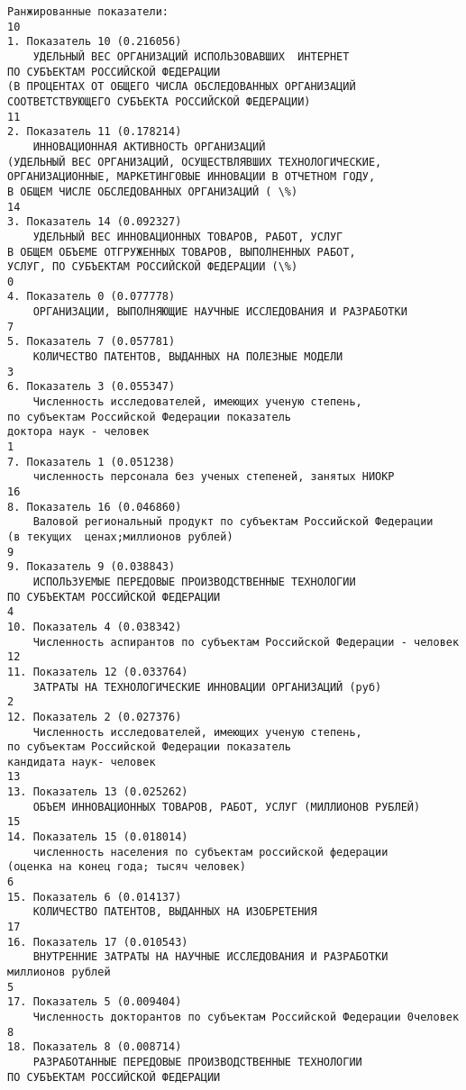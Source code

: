 \documentclass[11pt]{article}
\begin{document}
    \begin{Verbatim}[commandchars=\\\{\}]
Ранжированные показатели:
10
1. Показатель 10 (0.216056)
	УДЕЛЬНЫЙ ВЕС ОРГАНИЗАЦИЙ ИСПОЛЬЗОВАВШИХ  ИНТЕРНЕТ
ПО СУБЪЕКТАМ РОССИЙСКОЙ ФЕДЕРАЦИИ
(В ПРОЦЕНТАХ ОТ ОБЩЕГО ЧИСЛА ОБСЛЕДОВАННЫХ ОРГАНИЗАЦИЙ
СООТВЕТСТВУЮЩЕГО СУБЪЕКТА РОССИЙСКОЙ ФЕДЕРАЦИИ)
11
2. Показатель 11 (0.178214)
	ИННОВАЦИОННАЯ АКТИВНОСТЬ ОРГАНИЗАЦИЙ
(УДЕЛЬНЫЙ ВЕС ОРГАНИЗАЦИЙ, ОСУЩЕСТВЛЯВШИХ ТЕХНОЛОГИЧЕСКИЕ,
ОРГАНИЗАЦИОННЫЕ, МАРКЕТИНГОВЫЕ ИННОВАЦИИ В ОТЧЕТНОМ ГОДУ,
В ОБЩЕМ ЧИСЛЕ ОБСЛЕДОВАННЫХ ОРГАНИЗАЦИЙ ( \%)
14
3. Показатель 14 (0.092327)
	УДЕЛЬНЫЙ ВЕС ИННОВАЦИОННЫХ ТОВАРОВ, РАБОТ, УСЛУГ
В ОБЩЕМ ОБЪЕМЕ ОТГРУЖЕННЫХ ТОВАРОВ, ВЫПОЛНЕННЫХ РАБОТ,
УСЛУГ, ПО СУБЪЕКТАМ РОССИЙСКОЙ ФЕДЕРАЦИИ (\%)
0
4. Показатель 0 (0.077778)
	ОРГАНИЗАЦИИ, ВЫПОЛНЯЮЩИЕ НАУЧНЫЕ ИССЛЕДОВАНИЯ И РАЗРАБОТКИ
7
5. Показатель 7 (0.057781)
	КОЛИЧЕСТВО ПАТЕНТОВ, ВЫДАННЫХ НА ПОЛЕЗНЫЕ МОДЕЛИ
3
6. Показатель 3 (0.055347)
	Численность исследователей, имеющих ученую степень,
по субъектам Российской Федерации показатель
доктора наук - человек
1
7. Показатель 1 (0.051238)
	численность персонала без ученых степеней, занятых НИОКР
16
8. Показатель 16 (0.046860)
	Валовой региональный продукт по субъектам Российской Федерации
(в текущих  ценах;миллионов рублей)
9
9. Показатель 9 (0.038843)
	ИСПОЛЬЗУЕМЫЕ ПЕРЕДОВЫЕ ПРОИЗВОДСТВЕННЫЕ ТЕХНОЛОГИИ
ПО СУБЪЕКТАМ РОССИЙСКОЙ ФЕДЕРАЦИИ
4
10. Показатель 4 (0.038342)
	Численность аспирантов по субъектам Российской Федерации - человек
12
11. Показатель 12 (0.033764)
	ЗАТРАТЫ НА ТЕХНОЛОГИЧЕСКИЕ ИННОВАЦИИ ОРГАНИЗАЦИЙ (руб)
2
12. Показатель 2 (0.027376)
	Численность исследователей, имеющих ученую степень,
по субъектам Российской Федерации показатель
кандидата наук- человек
13
13. Показатель 13 (0.025262)
	ОБЪЕМ ИННОВАЦИОННЫХ ТОВАРОВ, РАБОТ, УСЛУГ (МИЛЛИОНОВ РУБЛЕЙ)
15
14. Показатель 15 (0.018014)
	численность населения по субъектам российской федерации
(оценка на конец года; тысяч человек)
6
15. Показатель 6 (0.014137)
	КОЛИЧЕСТВО ПАТЕНТОВ, ВЫДАННЫХ НА ИЗОБРЕТЕНИЯ
17
16. Показатель 17 (0.010543)
	ВНУТРЕННИЕ ЗАТРАТЫ НА НАУЧНЫЕ ИССЛЕДОВАНИЯ И РАЗРАБОТКИ
миллионов рублей
5
17. Показатель 5 (0.009404)
	Численность докторантов по субъектам Российской Федерации 0человек
8
18. Показатель 8 (0.008714)
	РАЗРАБОТАННЫЕ ПЕРЕДОВЫЕ ПРОИЗВОДСТВЕННЫЕ ТЕХНОЛОГИИ
ПО СУБЪЕКТАМ РОССИЙСКОЙ ФЕДЕРАЦИИ

    \end{Verbatim}

    \begin{center}
    \end{center}
    { \hspace*{\fill} \\}
    
\end{document}
